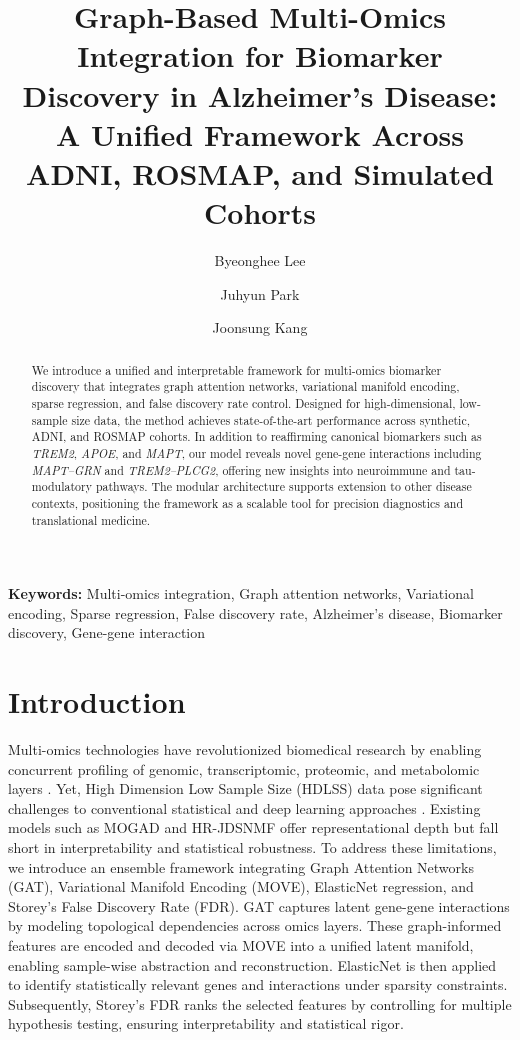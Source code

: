 \documentclass[12pt]{article}
\title{Graph-Based Multi-Omics Integration for Biomarker Discovery in Alzheimer's Disease: A Unified Framework Across ADNI, ROSMAP, and Simulated Cohorts}
\author[1]{Byeonghee Lee}
\author[2]{Juhyun Park}
\author[3]{Joonsung Kang}
\affil[1]{Department of Mathematics and Physics, Gangneung-Wonju National University, Republic of Korea}
\affil[2]{Department of Statistics, Dongguk University, Republic of Korea}
\affil[3]{Department of Data Science, Gangneung-Wonju National University, Republic of Korea}
\date{}
\providecommand{\keywords}[1]{\textbf{Keywords:} #1}
\begin{document}
\maketitle
\date{}

\begin{abstract}
We introduce a unified and interpretable framework for multi-omics biomarker discovery that integrates graph attention networks, variational manifold encoding, sparse regression, and false discovery rate control. Designed for high-dimensional, low-sample size data, the method achieves state-of-the-art performance across synthetic, ADNI, and ROSMAP cohorts. In addition to reaffirming canonical biomarkers such as \textit{TREM2}, \textit{APOE}, and \textit{MAPT}, our model reveals novel gene-gene interactions including \textit{MAPT–GRN} and \textit{TREM2–PLCG2}, offering new insights into neuroimmune and tau-modulatory pathways. The modular architecture supports extension to other disease contexts, positioning the framework as a scalable tool for precision diagnostics and translational medicine.
\end{abstract}
\keywords{Multi-omics integration, Graph attention networks, Variational encoding, Sparse regression, False discovery rate, Alzheimer's disease, Biomarker discovery, Gene-gene interaction}
\section{Introduction}
Multi-omics technologies have revolutionized biomedical research by enabling concurrent profiling of genomic, transcriptomic, proteomic, and metabolomic layers \citep{Wang2021, hasin2017multiomics, karczewski2018integrative}. Yet, High Dimension Low Sample Size (HDLSS) data pose significant challenges to conventional statistical and deep learning approaches \citep{fan2008sure, lecun2015deep}. Existing models such as MOGAD \citep{zhang2025mogad} and HR-JDSNMF \citep{tu2024hrjdsnfmf} offer representational depth but fall short in interpretability and statistical robustness.
To address these limitations, we introduce an ensemble framework integrating Graph Attention Networks (GAT), Variational Manifold Encoding (MOVE), ElasticNet regression, and Storey's False Discovery Rate (FDR). GAT captures latent gene-gene interactions by modeling topological dependencies across omics layers. These graph-informed features are encoded and decoded via MOVE into a unified latent manifold, enabling sample-wise abstraction and reconstruction. ElasticNet is then applied to identify statistically relevant genes and interactions under sparsity constraints. Subsequently, Storey's FDR ranks the selected features by controlling for multiple hypothesis testing, ensuring interpretability and statistical rigor.
\end{document}
